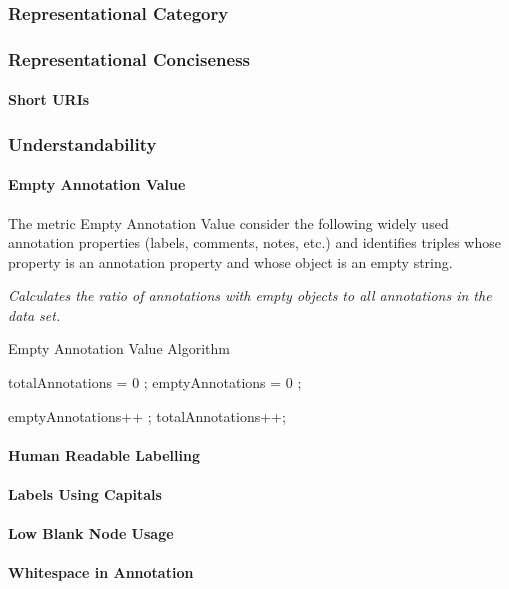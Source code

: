 
\subsubsection{Representational Category}
\label{sec:Representational} 


\subsubsection{Representational Conciseness}

\paragraph{Short URIs}

\subsubsection{Understandability}


\paragraph{Empty Annotation Value}
The metric Empty Annotation Value consider the following widely used annotation properties (labels, comments, notes, etc.) and identifies triples whose property is an annotation property and whose object is an empty string.
 
\begin{mdframed}[style=metricdefinition]
\emph{Calculates the ratio of annotations with empty objects to all annotations in the data set.}
\end{mdframed}

\begin{algorithm}
\caption{Empty Annotation Value Algorithm}\label{lst:emptyAnnotationValue}
\begin{algorithmic}[1]
\State totalAnnotations = 0 ;
\State emptyAnnotations = 0 ;
\EndProcedure

 emptyAnnotations++ ; \EndIf
\State totalAnnotations++;
\EndIf
\EndProcedure
\end{algorithmic}
\end{algorithm}


\paragraph{Human Readable Labelling}
\paragraph{Labels Using Capitals}
\paragraph{Low Blank Node Usage}
\paragraph{Whitespace in Annotation}